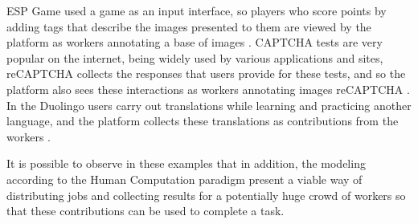 ESP Game used a game as an input interface, so players who score points by adding tags that describe the images presented to them are viewed by the platform as workers annotating a base of images \cite{Robertson:2009:REG:1520340.1520597}. CAPTCHA tests are very popular on the internet, being widely used by various applications and sites, reCAPTCHA collects the responses that users provide for these tests, and so the platform also sees these interactions as workers annotating images reCAPTCHA \cite{Simmons:2010:PLV:1869086.1869102}. In the Duolingo users carry out translations while learning and practicing another language, and the platform collects these translations as contributions from the workers \cite{Abaunza:2016:BRW:3012430.3012522}.

It is possible to observe in these examples that in addition, the modeling according to the Human Computation paradigm present a viable way of distributing jobs and collecting results for a potentially huge crowd of workers so that these contributions can be used to complete a task.


